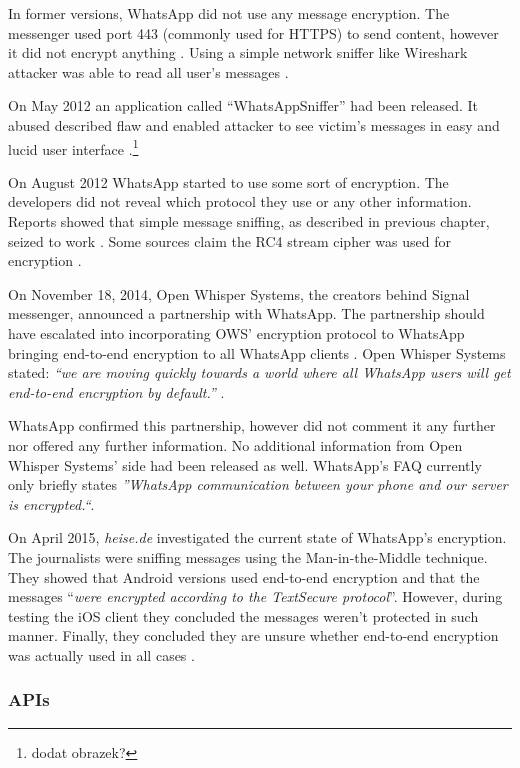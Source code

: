 \documentclass[thesis=M,english]{FITthesis}[2012/10/20]
\begin{document}
In former versions, WhatsApp did not use any message encryption. The messenger used port 443 (commonly used for HTTPS) to send content, however it did not encrypt anything \cite{whatsapp-plaintext}. Using a simple network sniffer like Wireshark attacker was able to read all user's messages \cite{whatsapp-plaintext}.

On May 2012 an application called ``WhatsAppSniffer'' had been released. It abused described flaw and enabled attacker to see victim's messages in easy and lucid user interface \cite{whatsapp-sniffer}\cite{whatsapp-sniffer2}.\footnote{dodat obrazek?}

On August 2012 WhatsApp started to use some sort of encryption. The developers did not reveal which protocol they use or any other information. Reports showed that simple message sniffing, as described in previous chapter, seized to work \cite{whatsapp-sniffernomore}. Some sources claim the  RC4 stream cipher was used for encryption \cite{whatsapp-rc4}\cite{whatsapp-rc42}.

On November 18, 2014, Open Whisper Systems, the creators behind Signal messenger, announced a partnership with WhatsApp. The partnership should have escalated into incorporating OWS' encryption protocol to WhatsApp bringing end-to-end encryption to all WhatsApp clients \cite{openwhisperwhatsapp}. Open Whisper Systems stated: \emph{``we are moving quickly towards a world where all WhatsApp users will get end-to-end encryption by default.''} \cite{openwhisperwhatsapp}.

WhatsApp confirmed this partnership, however did not comment it any further nor offered any further information. No additional information from Open Whisper Systems' side had been released as well. WhatsApp's FAQ currently only briefly states \emph{''WhatsApp communication between your phone and our server is encrypted.``}\cite{whatsapp-faq}.

On April 2015, \emph{heise.de} investigated the current state of WhatsApp's encryption. The journalists were sniffing messages using the Man-in-the-Middle technique. They showed that Android versions used end-to-end encryption and that the messages ``\emph{were encrypted according to the TextSecure protocol}''\cite{whatsapp-encstate}. However, during testing the iOS client they concluded the messages weren't protected in such manner. Finally, they concluded they are unsure whether end-to-end encryption was actually used in all cases \cite{whatsapp-encstate}.

\subsubsection{APIs}
\end{document}
